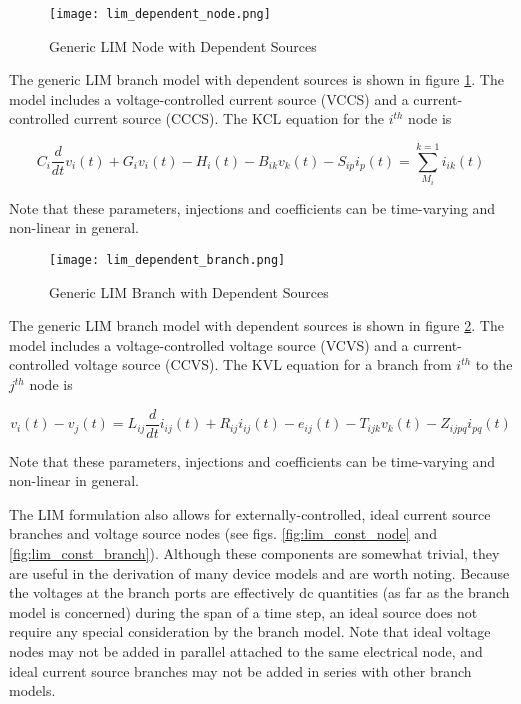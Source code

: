 \begin{figure}[ht]
    \centering
    \texttt{[image: lim\_dependent\_node.png]}
    \caption{Generic LIM Node with Dependent Sources}
    \label{fig:lim_dependent_node}
\end{figure}

The generic LIM branch model with dependent sources is shown in figure \ref{fig:lim_dependent_node}. The model includes a voltage-controlled current source (VCCS) and a current-controlled current source (CCCS). The KCL equation for the $i^{th}$ node is

\begin{equation} \label{eq:lim_dependent_node}
C_i \frac{d}{dt} v_i(t) + G_i v_i(t) - H_i(t) - B_{ik} v_k(t) - S_{ip} i_p(t) = \sum_{M_i}^{k=1}{i_{ik}(t)}
\end{equation}

Note that these parameters, injections and coefficients can be time-varying and non-linear in general. 

\begin{figure}[ht]
    \label{fig:lim_dependent_branch}
    \centering
    \texttt{[image: lim\_dependent\_branch.png]}
    \caption{Generic LIM Branch with Dependent Sources}
\end{figure}

The generic LIM branch model with dependent sources is shown in figure \ref{fig:lim_dependent_branch}. The model includes a voltage-controlled voltage source (VCVS) and a current-controlled voltage source (CCVS). The KVL equation for a branch from $i^{th}$ to the $j^{th}$ node is

\begin{equation} \label{eq:lim_dependent_branch}
v_i(t)-v_j(t) = L_{ij} \frac{d}{dt} i_{ij}(t) + R_{ij} i_{ij}(t) - e_{ij}(t) - T_{ijk}v_k(t) - Z_{ijpq} i_{pq}(t)
\end{equation}

Note that these parameters, injections and coefficients can be time-varying and non-linear in general.  

The LIM formulation also allows for externally-controlled, ideal current source branches and voltage source nodes (see figs. \ref{fig:lim_const_node} and \ref{fig:lim_const_branch}). Although these components are somewhat trivial, they are useful in the derivation of many device models and are worth noting. Because the voltages at the branch ports are effectively dc quantities (as far as the branch model is concerned) during the span of a time step, an ideal source does not require any special consideration by the branch model. Note that ideal voltage nodes may not be added in parallel attached to the same electrical node, and ideal current source branches may not be added in series with other branch models.  

